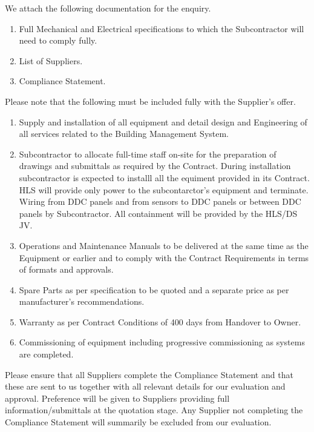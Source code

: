 \documentclass[a4paper,12pt,oneside]{article}
\begin{document}
\begin{mcdletter}

We attach the following documentation for the enquiry.

\begin{enumerate}    

\item Full Mechanical and Electrical specifications to which the Subcontractor will need to comply fully.
\item List of Suppliers.
\item Compliance Statement.
\end{enumerate}

Please note that the following must be included fully with the Supplier's offer.

\begin{enumerate}
\item Supply and installation of all equipment and detail design and Engineering of all services related to the Building Management System.

\item Subcontractor to allocate full-time staff on-site for the preparation of drawings and submittals as required by the Contract. During installation subcontractor is expected to installl all the equiment provided in its Contract. HLS will provide only power to the subcontarctor's equipment and terminate. Wiring from DDC panels and from sensors to DDC panels or between DDC panels by Subcontractor. All containment will be provided by the HLS/DS JV.

\item Operations and Maintenance Manuals to be delivered at the same time as the Equipment or earlier and to comply with the Contract Requirements in terms of formats and approvals.

\item Spare Parts as per specification to be quoted and a separate price as per manufacturer's recommendations.

\item Warranty as per Contract Conditions of 400 days from Handover to Owner.

\item Commissioning of equipment including progressive commissioning as systems are completed.
\end{enumerate}

Please ensure that all Suppliers complete the Compliance Statement and that these are sent to us together with all relevant details for our evaluation and approval. Preference will be given to Suppliers providing full information/submittals at the quotation stage. Any Supplier not completing the Compliance Statement will summarily be excluded from our evaluation.
\end{mcdletter}
\end{document}
